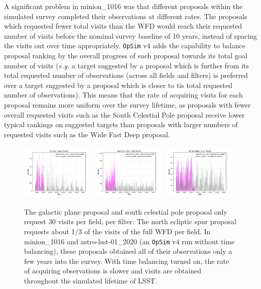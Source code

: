 \documentclass[DM,lsstdraft,authoryear,toc]{lsstdoc}
\newcommand{\opsim}{\texttt{OpSim}\xspace}
\begin{document}
A significant problem in minion\_1016 was that different proposals within the simulated survey completed their observations at different rates. The proposals which requested fewer total visits than the WFD would reach their requested number of visits before the nominal survey baseline of 10 years, instead of spacing the visits out over time appropriately. \opsim v4 adds the capability to balance proposal ranking by the overall progress of each proposal towards its total goal number of visits ({\it e.g.} a target suggested by a proposal which is further from its total requested number of observations (across all fields and filters) is preferred over a target suggested by a proposal which is closer to tis total requested number of observations). This means that the rate of acquiring visits for each proposal remains more uniform over the survey lifetime, as proposals with fewer overall requested visits such as the South Celestial Pole proposal receive lower typical rankings on suggested targets than proposals with larger numbers of requested visits such as the Wide Fast Deep proposal.

\begin{figure}[ht]
\centering
\includegraphics[width=0.32\textwidth]{figures/timebalancing_gp}
\includegraphics[width=0.32\textwidth]{figures/timebalancing_scp}
\includegraphics[width=0.32\textwidth]{figures/timebalancing_nes}
\caption{The galactic plane proposal and south celestial pole proposal only request 30 visits per field, per filter. The north ecliptic spur proposal requests about 1/3 of the visits of the full WFD per field. In minion\_1016 and astro-lsst-01\_2020 (an \opsim v4 run without time balancing), these proposals obtained all of their observations only a few years into the survey. With time balancing turned on, the rate of acquiring observations is slower and visits are obtained throughout the simulated lifetime of LSST.
\label{fig:timebalancing}}
\end{figure}
\end{document}
